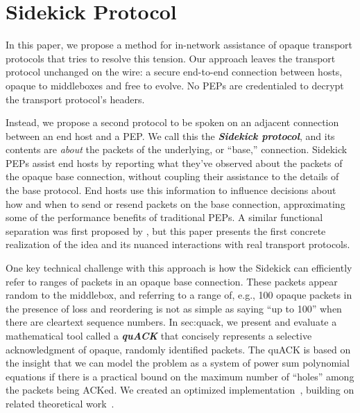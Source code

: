 \chapter{Sidekick Protocol}
\label{sec:sidekick}

In this paper, we propose a method for in-network assistance of opaque transport
protocols that tries to resolve this tension. Our approach leaves the transport
protocol unchanged on the wire: a secure end-to-end connection between hosts,
opaque to middleboxes and free to evolve. No PEPs are credentialed to decrypt
the transport protocol's headers.

Instead, we propose a second protocol to be spoken on an adjacent connection
between an end host and a PEP. We call this the \emph{\bf Sidekick protocol},
and its contents are \emph{about} the packets of the underlying, or ``base,''
connection. Sidekick PEPs assist end hosts by reporting what they've observed
about the packets of the opaque base connection, without coupling their
assistance to the details of the base protocol. End hosts use this information
to influence decisions about how and when to send or resend packets on the base
connection, approximating some of the performance benefits of traditional PEPs.
A similar functional separation was first proposed by \cite
{yuan2022sidecar}, but this paper presents the first concrete realization of
the idea and its nuanced interactions with real transport protocols.

One key technical challenge with this approach is how the Sidekick can
efficiently refer to ranges of packets in an opaque base connection. These
packets appear random to the middlebox, and referring to a range of, e.g., 100
opaque packets in the presence of loss and reordering is not as simple as
saying ``up to 100'' when there are cleartext sequence numbers. In \Cref
{sec:quack}, we present and evaluate a mathematical tool called a \emph
{\bf quACK} that concisely represents a selective acknowledgment of opaque,
randomly identified packets. The quACK is based on the insight that we can
model the problem as a system of power sum polynomial equations if there is a
practical bound on the maximum number of ``holes'' among the packets being
ACKed. We created an optimized implementation~\cite{quack-github}, building on
related theoretical work~\cite
{eppstein2011straggler,minsky2003set,karpovsky2003data}.

